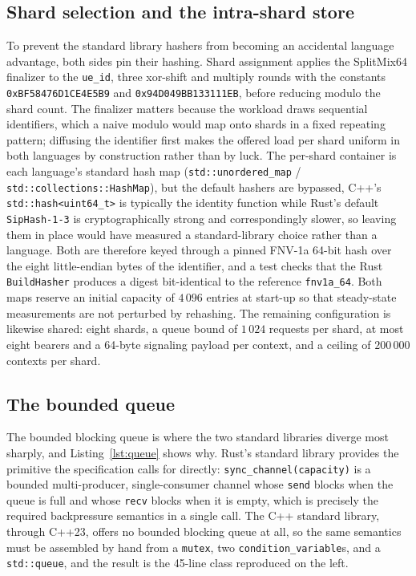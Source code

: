\documentclass[english,twoside,openright,a4paper,censored,csm,software-track-2020]{HYthesisML}
\begin{document}
\subsection{Shard selection and the intra-shard store}
To prevent the standard library hashers from becoming an accidental language advantage, both
sides pin their hashing. Shard assignment applies the SplitMix64 finalizer to the
\texttt{ue\_id}, three xor-shift and multiply rounds with the constants
\texttt{0xBF58476D1CE4E5B9} and \texttt{0x94D049BB133111EB}, before reducing modulo the shard
count. The finalizer matters because the workload draws sequential identifiers, which a naive
modulo would map onto shards in a fixed repeating pattern; diffusing the identifier first
makes the offered load per shard uniform in both languages by construction rather than by
luck. The per-shard container is each language's standard hash map
(\texttt{std::unordered\_map} / \texttt{std::collections::HashMap}), but the default hashers
are bypassed, C++'s \texttt{std::hash<uint64\_t>} is typically the identity function while
Rust's default \texttt{SipHash-1-3} is cryptographically strong and correspondingly slower,
so leaving them in place would have measured a standard-library choice rather than a language.
Both are therefore keyed through a pinned FNV-1a 64-bit hash over the eight little-endian
bytes of the identifier, and a test checks that the Rust \texttt{BuildHasher} produces a
digest bit-identical to the reference \texttt{fnv1a\_64}. Both maps reserve an initial
capacity of $4\,096$ entries at start-up so that steady-state measurements are not perturbed
by rehashing. The remaining configuration is likewise shared: eight shards, a queue bound of
$1\,024$ requests per shard, at most eight bearers and a 64-byte signaling payload per
context, and a ceiling of $200\,000$ contexts per shard.

\subsection{The bounded queue}
The bounded blocking queue is where the two standard libraries diverge most sharply, and
Listing~\ref{lst:queue} shows why. Rust's standard library provides the primitive the
specification calls for directly: \texttt{sync\_channel(capacity)} is a bounded multi-producer,
single-consumer channel whose \texttt{send} blocks when the queue is full and whose
\texttt{recv} blocks when it is empty, which is precisely the required backpressure semantics
in a single call. The C++ standard library, through C++23, offers no bounded blocking queue at
all, so the same semantics must be assembled by hand from a \texttt{mutex}, two
\texttt{condition\_variable}s, and a \texttt{std::queue}, and the result is the 45-line class
reproduced on the left.
\end{document}
